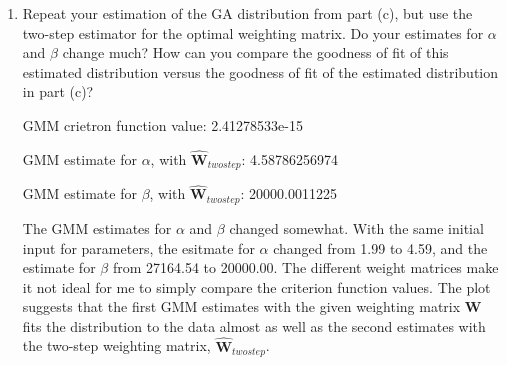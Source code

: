 \documentclass[letterpaper,12pt]{article}
\theoremstyle{definition}
\begin{document}
\begin{enumerate}
\begin{enumerate}
\item Repeat your estimation of the GA distribution from part (c), but use the two-step estimator for the optimal weighting matrix. Do your estimates for $\alpha$ and $\beta$ change much? How can you compare the goodness of fit of this estimated distribution versus the goodness of fit of the estimated distribution in part (c)?
\par
\begin{figure}[H]\centering\captionsetup{width=4.0in}
\end{figure}
\par
GMM crietron function value: 2.41278533e-15\par
GMM estimate for $\alpha$, with $\hat{\textbf{W}}_{twostep}$: 4.58786256974   \par
GMM estimate for $\beta$, with $\hat{\textbf{W}}_{twostep}$: 20000.0011225\par
\bigskip
The GMM estimates for $\alpha$ and $\beta$ changed somewhat. With the same initial input for parameters, the esitmate for $\alpha$ changed from 1.99 to 4.59, and the estimate for $\beta$ from 27164.54 to 20000.00. The different weight matrices make it not ideal for me to simply compare the criterion function values. The plot suggests that the first GMM estimates with the given weighting matrix $\textbf{W}$ fits the distribution to the data almost as well as the second estimates with the two-step weighting matrix, $\hat{\textbf{W}}_{twostep}$. 
\end {enumerate}
\end {enumerate}
\end{document}
